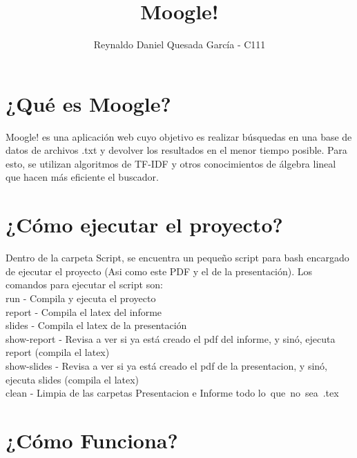 \documentclass{article}
\begin{document}
\title{\textcolor{graphcolor}{\textbf{\Huge{Moogle!}}}}
\author{\LARGE{\textcolor{graphcolor}{Reynaldo Daniel Quesada García - C111}}}

\maketitle

\newpage

\begin{center}
\section*{\textcolor{graphcolor}{{\centering ¿Qué es Moogle?}}}

Moogle! es una aplicación web cuyo objetivo es realizar búsquedas en una base de 
datos de archivos .txt y devolver los resultados en el menor tiempo posible. Para esto, se 
utilizan algoritmos de TF-IDF y otros conocimientos de álgebra lineal que hacen más 
eficiente el buscador.

\section*{\textcolor{graphcolor}{{\centering ¿Cómo ejecutar el proyecto?}}}

Dentro de la carpeta Script, se encuentra un pequeño script para bash encargado de ejecutar el proyecto (Asi como este PDF y el de la presentación). Los comandos para ejecutar el script son:
\\run - Compila y ejecuta el proyecto
\\report - Compila el latex del informe
\\slides - Compila el latex de la presentación
\\show-report - Revisa a ver si ya está creado el pdf del informe, y sinó, ejecuta report (compila el latex)
\\show-slides - Revisa a ver si ya está creado el pdf de la presentacion, y sinó, ejecuta slides (compila el latex)
\\clean - Limpia de las carpetas Presentacion e Informe todo lo que no sea .tex


\newpage

\section*{\textcolor{graphcolor}{{\centering ¿Cómo Funciona?}}}


\end{center}
\end{document}
